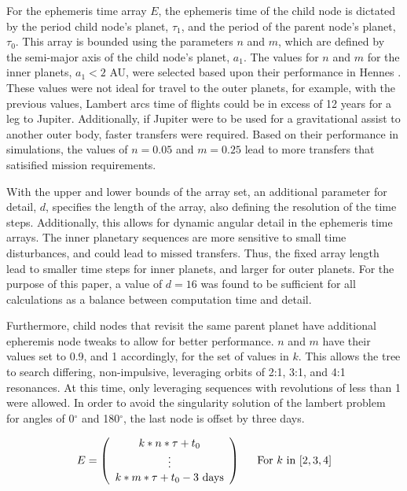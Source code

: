 \documentclass[letterpaper, preprint, paper,11pt]{AAS}	%
\begin{document}
For the ephemeris time array $E$, the ephemeris time of the child node is dictated by the period child node's planet, $\tau_1$, and the period of the parent node's planet, $\tau_0$. This array is bounded using the parameters $n$ and $m$, which are defined by the semi-major axis of the child node's planet, $a_1$. The values for $n$ and $m$ for the inner planets, $a_1 < 2$ AU, were selected based upon their performance in Hennes \cite{Hennes2015}. These values were not ideal for travel to the outer planets, for example, with the previous values, Lambert arcs time of flights could be in excess of 12 years for a leg to Jupiter. Additionally, if Jupiter were to be used for a gravitational assist to another outer body, faster transfers were required. Based on their performance in simulations, the values of $n = 0.05$ and $m = 0.25$ lead to more transfers that satisified mission requirements. %

With the upper and lower bounds of the array set, an additional parameter for detail, $d$, specifies the length of the array, also defining the resolution of the time steps. Additionally, this allows for dynamic angular detail in the ephemeris time arrays. The inner planetary sequences are more sensitive to small time disturbances, and could lead to missed transfers. Thus, the fixed array length lead to smaller time steps for inner planets, and larger for outer planets. For the purpose of this paper, a value of $d = 16$ was found to be sufficient for all calculations as a balance between computation time and detail. 

Furthermore, child nodes that revisit the same parent planet have additional epheremis node tweaks to allow for better performance. $n$ and $m$ have their values set to 0.9, and 1 accordingly, for the set of values in $k$. This allows the tree to search differing, non-impulsive, leveraging orbits of 2:1, 3:1, and 4:1 resonances. At this time, only leveraging sequences with revolutions of less than 1 were allowed. In order to avoid the singularity solution of the lambert problem for angles of 0$^\circ$ and 180$^\circ$, the last node is offset by three days.

\begin{equation}
    \label{eq:ephemArrayLev}
    E = 
    \left(\begin{array}{c}
        k*n*\tau + t_0 \\ 
        \vdots \\
        k*m*\tau + t_0 - 3 \text{ days} \\
    \end{array}\right)\hspace{1.5em}
    \text{For } k \text{ in } [2, 3, 4]
\end{equation}
\end{document}
